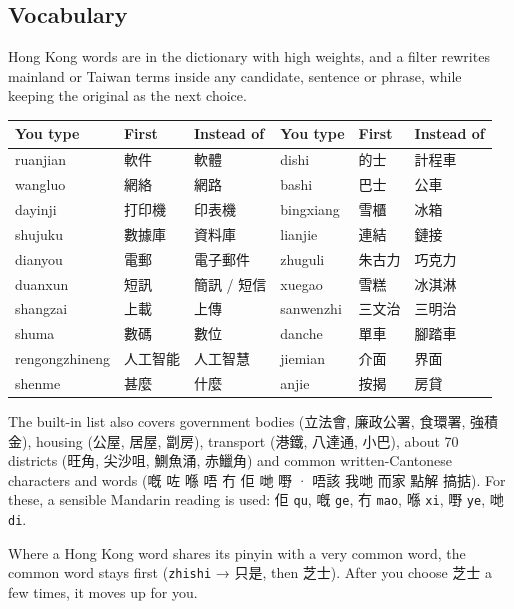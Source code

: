 \documentclass[11pt,a4paper]{article}
\newcommand{\code}[1]{\texttt{#1}}
\begin{document}
\subsection{Vocabulary}
Hong Kong words are in the dictionary with high weights, and a filter rewrites mainland or
Taiwan terms inside any candidate, sentence or phrase, while keeping the original as the next choice.

\begin{center}
\renewcommand{\arraystretch}{1.18}
\begin{tabular}{@{}lll@{\hspace{2.2em}}lll@{}}
\toprule
\textbf{You type} & \textbf{First} & \textbf{Instead of} & \textbf{You type} & \textbf{First} & \textbf{Instead of} \\
\midrule
ruanjian & 軟件 & 軟體 & dishi & 的士 & 計程車 \\
wangluo & 網絡 & 網路 & bashi & 巴士 & 公車 \\
dayinji & 打印機 & 印表機 & bingxiang & 雪櫃 & 冰箱 \\
shujuku & 數據庫 & 資料庫 & lianjie & 連結 & 鏈接 \\
dianyou & 電郵 & 電子郵件 & zhuguli & 朱古力 & 巧克力 \\
duanxun & 短訊 & 簡訊 / 短信 & xuegao & 雪糕 & 冰淇淋 \\
shangzai & 上載 & 上傳 & sanwenzhi & 三文治 & 三明治 \\
shuma & 數碼 & 數位 & danche & 單車 & 腳踏車 \\
rengongzhineng & 人工智能 & 人工智慧 & jiemian & 介面 & 界面 \\
shenme & 甚麼 & 什麼 & anjie & 按揭 & 房貸 \\
\bottomrule
\end{tabular}
\end{center}

The built-in list also covers government bodies (立法會, 廉政公署, 食環署, 強積金),
housing (公屋, 居屋, 劏房), transport (港鐵, 八達通, 小巴), about 70 districts
(旺角, 尖沙咀, 鰂魚涌, 赤鱲角) and common written-Cantonese characters and words
(嘅 咗 喺 唔 冇 佢 哋 嘢 · 唔該 我哋 而家 點解 搞掂). For these, a sensible Mandarin
reading is used: 佢 \code{qu}, 嘅 \code{ge}, 冇 \code{mao}, 喺 \code{xi}, 嘢 \code{ye}, 哋 \code{di}.

Where a Hong Kong word shares its pinyin with a very common word, the common word stays first
(\code{zhishi} → 只是, then 芝士). After you choose 芝士 a few times, it moves up for you.
\end{document}
